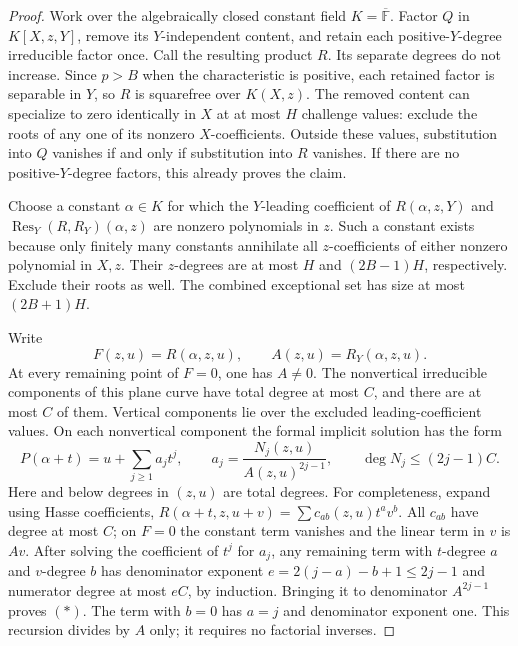 \begin{proof}
Work over the algebraically closed constant field
$K=\overline{\mathbb F}$. Factor $Q$ in $K[X,z,Y]$, remove its
$Y$-independent content, and retain each positive-$Y$-degree irreducible
factor once. Call the resulting product $R$. Its separate degrees do
not increase. Since $p>B$ when the characteristic is positive, each
retained factor is separable in $Y$, so $R$ is squarefree over
$K(X,z)$. The removed content can specialize to zero identically in
$X$ at at most $H$ challenge values: exclude the roots of any one of
its nonzero $X$-coefficients. Outside these values, substitution into
$Q$ vanishes if and only if substitution into $R$ vanishes. If there
are no positive-$Y$-degree factors, this already proves the claim.

Choose a constant $\alpha\in K$ for which the $Y$-leading coefficient
of $R(\alpha,z,Y)$ and
$\operatorname{Res}_Y(R,R_Y)(\alpha,z)$ are nonzero polynomials in $z$.
Such a constant exists because only finitely many constants annihilate
all $z$-coefficients of either nonzero polynomial in $X,z$.
Their $z$-degrees are at most $H$ and $(2B-1)H$, respectively.
Exclude their roots as well. The combined exceptional set has size
at most $(2B+1)H$.

Write
\[
 F(z,u)=R(\alpha,z,u),\qquad A(z,u)=R_Y(\alpha,z,u).
\]
At every remaining point of $F=0$, one has $A\ne0$.
The nonvertical irreducible components of this plane curve have total
degree at most $C$, and there are at most $C$ of them. Vertical
components lie over the excluded leading-coefficient values.
On each nonvertical component the formal implicit solution has the
form
\[
 P(\alpha+t)=u+\sum_{j\ge1}a_jt^j,
 \qquad
 a_j=\frac{N_j(z,u)}{A(z,u)^{2j-1}},\qquad
 \deg N_j\le(2j-1)C.                         \tag{$*$}
\]
Here and below degrees in $(z,u)$ are total degrees.
For completeness, expand using Hasse coefficients,
$R(\alpha+t,z,u+v)=\sum c_{ab}(z,u)t^av^b$.
All $c_{ab}$ have degree at most $C$; on $F=0$ the constant term
vanishes and the linear term in $v$ is $Av$.
After solving the coefficient of $t^j$ for $a_j$, any remaining term
with $t$-degree $a$ and $v$-degree $b$ has denominator exponent
$e=2(j-a)-b+1\le2j-1$ and numerator degree at most $eC$,
by induction. Bringing it to denominator $A^{2j-1}$ proves $(*)$.
The term with $b=0$ has $a=j$ and denominator exponent one.
This recursion divides by $A$ only; it requires no factorial inverses.


\end{proof}
